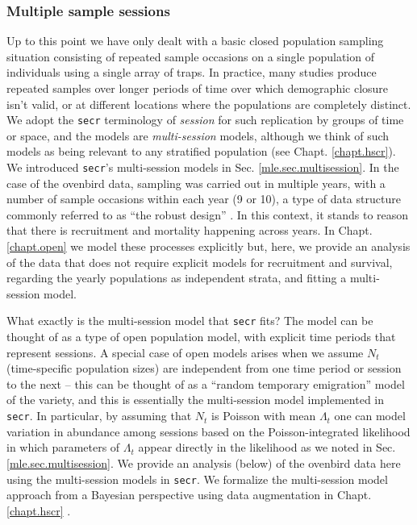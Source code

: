 \subsubsection{Multiple sample sessions}

Up to this point we have only dealt with a basic closed population
sampling situation consisting of repeated sample occasions on a single
population of individuals using a single array of traps. In practice,
many studies produce repeated samples over longer periods of time over
which demographic closure isn't valid, or at different
locations where the populations are completely distinct. We adopt the \mbox{\tt secr} terminology of {\it session}
for such replication by groups of time or space, and the models are
{\it multi-session} models, although we think of such models as being
relevant to any stratified population (see Chapt. \ref{chapt.hscr}).
We introduced \mbox{\tt secr}'s
multi-session models in Sec. \ref{mle.sec.multisession}.  In the case
of the ovenbird data, sampling was carried out in multiple years, with
a number of sample occasions within each year (9 or 10), a type of
data structure commonly referred to as ``the robust
design'' \citep{pollock:1982}.  In this context,
it stands to reason that there is recruitment and mortality happening
across years. In Chapt. \ref{chapt.open} we model these processes
explicitly but, here, we provide an analysis of the data that does not
require explicit models for recruitment and survival, regarding the
yearly populations as independent strata, and fitting a multi-session
model.

What exactly is the multi-session model that \mbox{\tt secr} fits? The
model can be thought of as a type of open population model, 
with explicit time periods that represent sessions.
 A special case of open models arises when
we assume $N_{t}$ (time-specific population sizes) are independent
from one time period or session to the next -- this can be thought of
as a ``random temporary emigration'' model of the
\citet{kendall_etal:1997} variety, and this is essentially the
multi-session model implemented in \mbox{\tt secr}.  In particular, by
assuming that $N_{t}$ is Poisson with mean $\Lambda_{t}$ one can model
variation in abundance among sessions based on the Poisson-integrated
likelihood in which parameters of $\Lambda_{t}$ appear directly in the
likelihood as we noted in Sec. \ref{mle.sec.multisession}.  We provide
an analysis (below) of the ovenbird data here using the multi-session
models in \mbox{\tt secr}.  We formalize the multi-session model
approach from a Bayesian perspective using data augmentation in
Chapt. \ref{chapt.hscr} \citep{converse_royle:2012,royle_converse:2013}.

